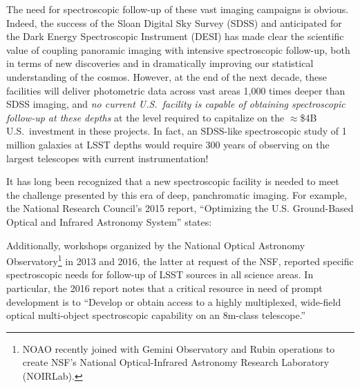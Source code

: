 \documentclass[11pt,a4paper,twoside,onecolumn,openany,final,oldfontcommands]{memoir}
\begin{document}
The need for spectroscopic follow-up of these vast imaging campaigns is obvious.  Indeed, the success of the Sloan Digital Sky Survey (SDSS) and anticipated for the Dark Energy Spectroscopic Instrument (DESI) has made clear the scientific value of coupling panoramic imaging with intensive spectroscopic follow-up, both in terms of new discoveries and in dramatically improving our statistical understanding of the cosmos.  However, at the end of the next decade, these facilities will deliver photometric data across vast areas 1,000 times deeper than SDSS imaging, and \textit{no current U.S.~facility is capable of obtaining spectroscopic follow-up at these depths} at the level required to capitalize on the $\approx$\$4B U.S.\ investment in these projects. In fact, an SDSS-like spectroscopic study of 1 million galaxies at LSST depths would require 300 years of observing on the largest telescopes with current instrumentation!

It has long been recognized that a new spectroscopic facility is needed to meet the challenge presented by this era of deep, panchromatic imaging. For example, the National Research Council's 2015 report, ``Optimizing the U.S. Ground-Based Optical and Infrared Astronomy System'' \citep{NAP21722} states:
%
\noindent{}
%
Additionally, workshops organized by the National Optical Astronomy Observatory\footnote{NOAO recently joined with Gemini Observatory and Rubin operations to create NSF's National Optical-Infrared Astronomy Research Laboratory (NOIRLab).} in 2013 and 2016, the latter at request of the NSF, reported specific spectroscopic needs for follow-up of LSST sources in all science areas.  In particular, the 2016 report notes that a critical resource in need of prompt development is to ``Develop or obtain access to a highly multiplexed, wide-field optical multi-object spectroscopic capability on an 8m-class telescope.''
\end{document}
